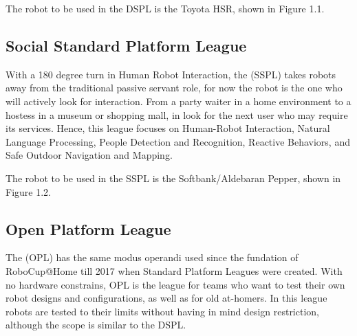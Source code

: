 The robot to be used in the DSPL is the Toyota HSR, shown in Figure 1.1.

\subsection{Social Standard Platform League}
With a 180 degree turn in Human Robot Interaction, the (SSPL) takes robots away from the traditional passive servant role, for now the robot is the one who will actively look for interaction. From a party waiter in a home environment to a hostess in a museum or shopping mall, in  look for the next user who may require its services. Hence, this league focuses on Human-Robot Interaction, Natural Language Processing, People Detection and Recognition, Reactive Behaviors, and Safe Outdoor Navigation and Mapping.

The robot to be used in the SSPL is the Softbank/Aldebaran Pepper, shown in Figure 1.2.

\subsection{Open Platform League}
The (OPL) has the same modus operandi used since the fundation of RoboCup@Home till 2017 when Standard Platform Leagues were created. With no hardware constrains, OPL is the league for teams who want to test their own robot designs and configurations, as well as for old at-homers. In this league robots are tested to their limits without having in mind design restriction, although the scope is similar to the DSPL. 
